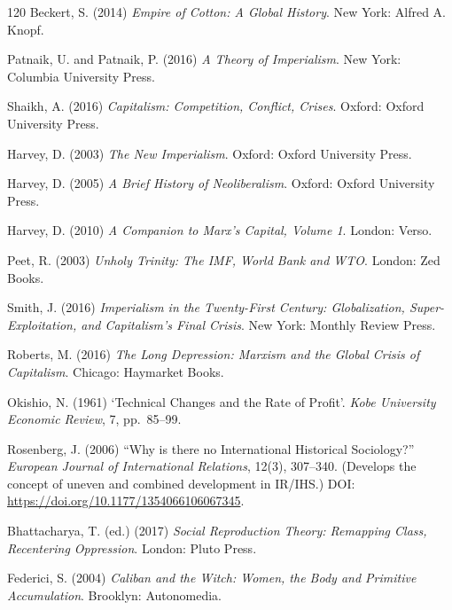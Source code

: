 \begin{singlespace}
\begin{thebibliography}{120}
Beckert, S. (2014) \emph{Empire of Cotton: A Global History}.
New York: Alfred A. Knopf.


Patnaik, U. and Patnaik, P. (2016) \emph{A Theory of Imperialism}.
New York: Columbia University Press.

Shaikh, A. (2016) \emph{Capitalism: Competition, Conflict, Crises}.
Oxford: Oxford University Press.

Harvey, D. (2003) \emph{The New Imperialism}.
Oxford: Oxford University Press.

Harvey, D. (2005) \emph{A Brief History of Neoliberalism}.
Oxford: Oxford University Press.

Harvey, D. (2010) \emph{A Companion to Marx's Capital, Volume 1}.
London: Verso.

Peet, R. (2003) \emph{Unholy Trinity: The IMF, World Bank and WTO}.
London: Zed Books.

Smith, J. (2016) \emph{Imperialism in the Twenty-First Century: Globalization, Super-Exploitation, and Capitalism's Final Crisis}.
New York: Monthly Review Press.

Roberts, M. (2016) \emph{The Long Depression: Marxism and the Global Crisis of Capitalism}.
Chicago: Haymarket Books.

Okishio, N. (1961) `Technical Changes and the Rate of Profit'. \emph{Kobe University Economic Review}, 7, pp.\ 85--99.

Rosenberg, J. (2006) ``Why is there no International Historical Sociology?'' \emph{European Journal of International Relations}, 12(3), 307--340.
(Develops the concept of uneven and combined development in IR/IHS.)
DOI: \url{https://doi.org/10.1177/1354066106067345}.

Bhattacharya, T. (ed.) (2017) \emph{Social Reproduction Theory: Remapping Class, Recentering Oppression}.
London: Pluto Press.

Federici, S. (2004) \emph{Caliban and the Witch: Women, the Body and Primitive Accumulation}.
Brooklyn: Autonomedia.


\end{thebibliography}
\end{singlespace}
